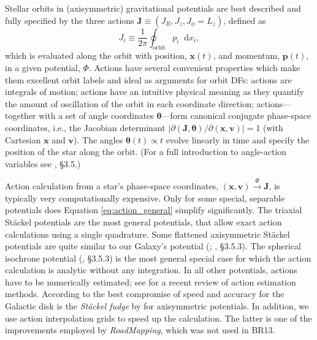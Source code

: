 \documentclass[iop,revtex4,numberedappendix,appendixfloats]{emulateapj}
\newcommand{\vect}[1]{\boldsymbol{#1}}
\newcommand*\diff{\mathop{}\!\mathrm{d}}
\newcommand{\RM}{{\sl RoadMapping}}
\begin{document}
Stellar orbits in (axisymmetric) gravitational potentials are best described and fully specified by the three actions $\vect{J} \equiv (J_R, J_z, J_\phi=L_z)$, defined as
\begin{equation}
J_i \equiv \frac{1}{2\pi} \oint_\text{orbit} p_i \diff x_i, \label{eq:action_general}
\end{equation}
which is evaluated along the orbit with position, $\vect{x}(t)$, and momentum, $\vect{p}(t)$, in a given potential, $\Phi$. Actions have several convenient properties which make them excellent orbit labels and ideal as arguments for orbit DFs: actions are integrals of motion; actions have an intuitive physical meaning as they quantify the amount of oscillation of the orbit in each coordinate direction; actions---together with a set of angle coordinates $\vect{\theta}$---form canonical conjugate phase-space coordinates, i.e., the Jacobian determinant $\left| \partial(\vect{J},\vect{\theta}) / \partial (\vect{x},\vect{v}) \right|=1$ (with Cartesian $\vect{x}$ and $\vect{v}$). The angles $\vect{\theta}(t)\propto t$ evolve linearly in time and specify the position of the star along the orbit. (For a full introduction to angle-action variables see \citealt{2008gady.book.....B}, \S 3.5.)

Action calculation from a star's phase-space coordinates, $(\vect{x},\vect{v}) \stackrel{\Phi}{\longrightarrow} \vect{J}$, is typically very computationally expensive. Only for some special, separable potentials does Equation \eqref{eq:action_general} simplify significantly. The triaxial St\"{a}ckel potentials \citep{1985MNRAS.216..273D} are the most general potentials, that allow exact action calculations using a single quadrature. Some flattened axisymmetric St\"{a}ckel potentials are quite similar to our Galaxy's potential (\citealt{1994AA...287...43B,2003MNRAS.340..752F}; \citealt{2008gady.book.....B}, \S 3.5.3). The spherical isochrone potential (\citealt{1959AnAp...22..126H,2008gady.book.....B}, \S 3.5.3) is the most general special case for which the action calculation is analytic without any integration. In all other potentials, actions have to be numerically estimated; see \citet{2016MNRAS.457.2107S} for a recent review of action estimation methods. According to \citet{2016MNRAS.457.2107S} the best compromise of speed and accuracy for the Galactic disk is the \emph{St\"{a}ckel fudge} by \citet{2012MNRAS.426.1324B} for axisymmetric potentials. In addition, we use action interpolation grids \citep{2012MNRAS.426.1324B,2015ApJS..216...29B} to speed up the calculation. The latter is one of the improvements employed by \RM{}, which was not used in BR13. 
\end{document}
